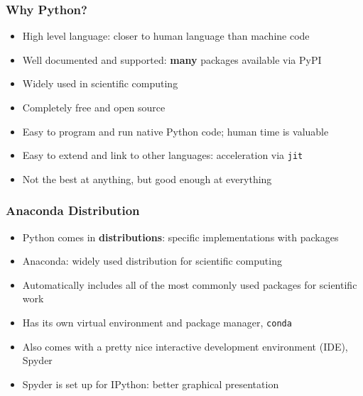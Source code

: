 \documentclass[aspectratio=169]{beamer}
\begin{document}
\begin{frame}
\frametitle{Why Python?}
\begin{itemize}
	\item High level language: closer to human language than machine code
	
	\item Well documented and supported: \textbf{many} packages available via PyPI
	
	\item <2->Widely used in scientific computing
	
	\item <2->Completely free and open source
	
	\item <3->Easy to program and run native Python code; human time is valuable
	
	\item <3->Easy to extend and link to other languages: acceleration via \texttt{jit}
	
	\item <4->Not the best at anything, but good enough at everything
\end{itemize}
\end{frame}


\begin{frame}
\frametitle{Anaconda Distribution}
\begin{itemize}
	\item Python comes in \textbf{distributions}: specific implementations with packages
	
	\item Anaconda: widely used distribution for scientific computing
	
	\item <2->Automatically includes all of the most commonly used packages for scientific work
	
	\item <2->Has its own virtual environment and package manager, \texttt{conda}
	
	\item <3->Also comes with a pretty nice interactive development environment (IDE), Spyder
	
	\item <3->Spyder is set up for IPython: better graphical presentation
\end{itemize}
\end{frame}
\end{document}

